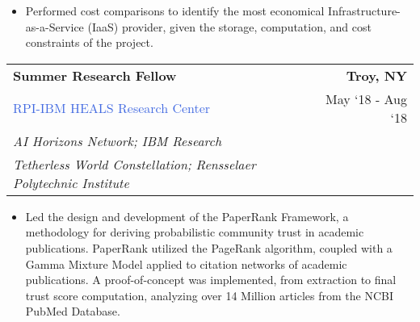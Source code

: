 \documentclass[10pt]{article}
\newcommand{\highlightcolor}{RoyalBlue}
\newcommand{\tabularxwidth}{\textwidth}
\begin{document}
\begin{minipage}{\tabularxwidth}
\begin{itemize}[noitemsep, topsep=3pt, parsep=0pt, partopsep=0pt]
                \item 
    Performed cost comparisons to identify the most economical Infrastructure-as-a-Service (IaaS) provider, given the storage, computation, and cost constraints of the project.
            
        \end{itemize}

        
            \vspace{.5em}
        

    \end{minipage}
    
    \begin{minipage}{\tabularxwidth}

        \begin{tabularx}{\tabularxwidth}{X r}
            \textbf{Summer Research Fellow} & \textbf{Troy, 
        NY} \\
            \textcolor{\highlightcolor}{RPI-IBM HEALS Research Center} & 
        
    May ‘18 - 
    Aug ‘18 \\
            
                
                    \textit{AI Horizons Network; IBM Research} & \\
                
                    \textit{Tetherless World Constellation; Rensselaer Polytechnic Institute} & \\
                
            
            
        \end{tabularx}

        \begin{itemize}[noitemsep, topsep=3pt, parsep=0pt, partopsep=0pt]
            
                \item 
    Led the design and development of the PaperRank Framework, a methodology for deriving probabilistic community trust in academic publications. PaperRank utilized the PageRank algorithm, coupled with a Gamma Mixture Model applied to citation networks of academic publications. A proof-of-concept was implemented, from extraction to final trust score computation, analyzing over 14 Million articles from the NCBI PubMed Database.
            

\end{itemize}
\end{minipage}
\end{document}
